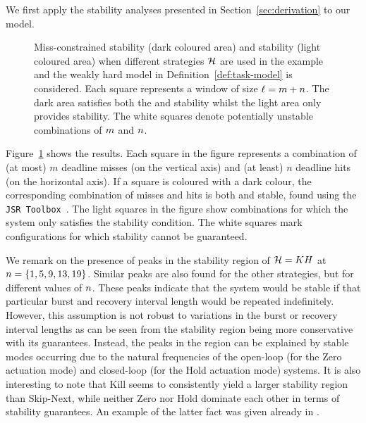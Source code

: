We first apply the stability analyses presented in Section~\ref{sec:derivation} to our model.
\begin{figure}[t]
    \centerline{}
    \caption{Miss-constrained stability (dark coloured area) and \nilsstability{} stability (light coloured area) when different strategies $\mathcal{H}$ are used in the example and the weakly hard model in Definition~\ref{def:task-model} is considered. Each square represents a window of size $\ell = m+n$. The dark area satisfies both the \switchingstability{} and \nilsstability{} stability whilst the light area only provides \nilsstability{} stability. The white squares denote potentially unstable combinations of $m$ and $n$.}
    \label{fig:stability_extended}
\end{figure}
Figure~\ref{fig:stability_extended} shows the results. Each square in the figure represents a combination of (at most) $m$ deadline misses (on the vertical axis) and (at least) $n$ deadline hits (on the horizontal axis).
If a square is coloured with a dark colour, the corresponding combination of misses and hits is both \nilsstability{} and \switchingstability{} stable, found using the {\tt JSR Toolbox}~\cite{Jungers:2014}. 
The light squares in the figure show combinations for which the system only satisfies the \nilsstability{} stability condition. 
The white squares mark configurations for which stability cannot be guaranteed.

We remark on the presence of peaks in the \nilsstability{} stability region of $\mathcal{H} = KH$ at $n = \{1, 5, 9, 13, 19\}$.
Similar peaks are also found for the other strategies, but for different values of $n$.
These peaks indicate that the system would be stable if that particular burst and recovery interval length would be repeated indefinitely.
However, this assumption is not robust to variations in the burst or recovery interval lengths as can be seen from the \switchingstability{} stability region being more conservative with its guarantees.
Instead, the peaks in the \nilsstability{} region can be explained by stable modes occurring due to the natural frequencies of the open-loop (for the Zero actuation mode) and closed-loop (for the Hold actuation mode) systems.
It is also interesting to note that Kill seems to consistently yield a larger stability region than Skip-Next, while neither Zero nor Hold dominate each other in terms of stability guarantees. An example of the latter fact was given already in \cite{schenato09}.

